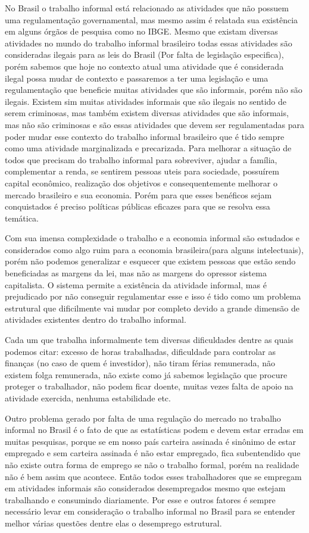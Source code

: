 No Brasil o trabalho informal está relacionado as atividades que não possuem uma regulamentação governamental, 
mas mesmo assim é relatada sua existência em alguns órgãos de pesquisa como no IBGE. Mesmo que existam diversas 
atividades no mundo do trabalho informal brasileiro todas essas atividades são consideradas ilegais para as leis 
do Brasil (Por falta de legislação especifica), porém sabemos que hoje no contexto atual uma atividade que é 
considerada ilegal possa mudar de contexto e passaremos a ter uma legislação e uma regulamentação que beneficie 
muitas atividades que são informais, porém não são ilegais. Existem sim muitas atividades informais que são 
ilegais no sentido de serem criminosas, mas também existem diversas atividades que são informais, mas não são
criminosas e são essas atividades que devem ser regulamentadas para poder mudar esse contexto do trabalho 
informal brasileiro que é tido sempre como uma atividade marginalizada e precarizada. Para melhorar a situação
de todos que precisam do trabalho informal para sobreviver, ajudar a família, complementar a renda, se sentirem
pessoas uteis para sociedade, possuírem capital econômico, realização dos objetivos e consequentemente melhorar
o mercado brasileiro e sua economia. Porém para que esses benéficos sejam conquistados é preciso políticas públicas
eficazes para que se resolva essa temática.

Com sua imensa complexidade o trabalho e a economia informal são estudados e  considerados como algo ruim para 
a economia brasileira(para alguns intelectuais), porém não podemos generalizar e esquecer que existem pessoas
que estão sendo beneficiadas as margens da lei, mas não as margens do opressor sistema capitalista. O sistema 
permite a existência da atividade informal, mas é prejudicado por não conseguir regulamentar esse e isso é tido
como um problema estrutural que dificilmente vai mudar por completo devido a grande dimensão de atividades 
existentes dentro do trabalho informal.

Cada um que trabalha informalmente tem diversas dificuldades dentre as quais podemos citar: excesso de horas 
trabalhadas, dificuldade para controlar as finanças (no caso de quem é investidor), não tiram férias remunerada,
não existem folga remunerada, não existe como já sabemos legislação que procure proteger o trabalhador, não podem 
ficar doente, muitas vezes falta de apoio na atividade exercida, nenhuma estabilidade etc.

Outro problema gerado por falta de uma regulação do mercado no trabalho informal no Brasil é o fato de que as 
estatísticas podem e devem estar erradas em muitas pesquisas, porque se em nosso país carteira assinada é sinônimo 
de estar empregado e sem carteira assinada é não estar empregado, fica subentendido que não existe outra forma de 
emprego se não o trabalho formal, porém na realidade não é bem assim que acontece. Então todos esses trabalhadores 
que se empregam em atividades informais são considerados desempregados mesmo que estejam trabalhando e consumindo
diariamente. Por esse e outros fatores é sempre necessário levar em consideração o trabalho informal no Brasil 
para se entender melhor várias questões dentre elas o desemprego estrutural.

